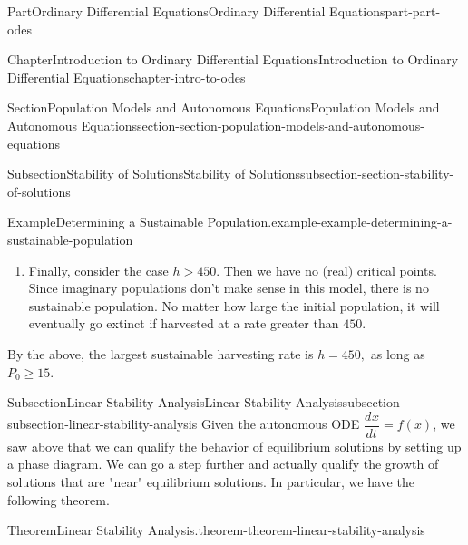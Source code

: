 \documentclass[twoside,10pt,]{book}
\newcommand{\terminology}[1]{\textbf{#1}}
\numberwithin{equation}{part}
\newcommand{\dv}[3][]{\dfrac{d^{#1} #2}{d #3^{#1}}}
\newcommand{\gt}{>}
\begin{document}
\begin{partptx}{Part}{Ordinary Differential Equations}{}{Ordinary Differential Equations}{}{}{part-part-odes}
\begin{chapterptx}{Chapter}{Introduction to Ordinary Differential Equations}{}{Introduction to Ordinary Differential Equations}{}{}{chapter-intro-to-odes}
\begin{sectionptx}{Section}{Population Models and Autonomous Equations}{}{Population Models and Autonomous Equations}{}{}{section-section-population-models-and-autonomous-equations}
\begin{subsectionptx}{Subsection}{Stability of Solutions}{}{Stability of Solutions}{}{}{subsection-section-stability-of-solutions}
\begin{example}{Example}{Determining a Sustainable Population.}{example-example-determining-a-sustainable-population}
\begin{enumerate}
\begin{figureptx}{Figure}{}{figure-example-determining-a-sustainable-population-c-c-b-b}{}
\begin{image}{0.25}{0.5}{0.25}{}
{
}%
\end{image}%
\tcblower
\end{figureptx}%
We interpret the phase diagram as follows: if \(P\) is less than 15,000%
 then the population will collapse to extinction. Otherwise, the population will stabilize at \(15,000\). This type of critical point is often called \terminology{semi-stable.}%
\item{}Finally, consider the case \(h \gt 450\). Then we have no (real) critical points. Since imaginary populations don't make sense in this model, there is no sustainable population. No matter how large the initial population, it will eventually go extinct if harvested at a rate greater than \(450\).%
\end{enumerate}
By the above, the largest sustainable harvesting rate is \(h = 450,\) as long as \(P_{0}\geq 15\).%
\end{example}
\end{subsectionptx}
%
%
\typeout{************************************************}
\typeout{************************************************}
%
\begin{subsectionptx}{Subsection}{Linear Stability Analysis}{}{Linear Stability Analysis}{}{}{subsection-subsection-linear-stability-analysis}
Given the autonomous ODE \(\dv{x}{t} = f(x)\), we saw above that we can qualify the behavior of equilibrium solutions by setting up a phase diagram. We can go a step further and actually qualify the growth of solutions that are "near" equilibrium solutions. In particular, we have the following theorem.%
\begin{theorem}{Theorem}{Linear Stability Analysis.}{}{theorem-theorem-linear-stability-analysis}%

\end{theorem}
\end{subsectionptx}
\end{sectionptx}
\end{chapterptx}
\end{partptx}
\end{document}

